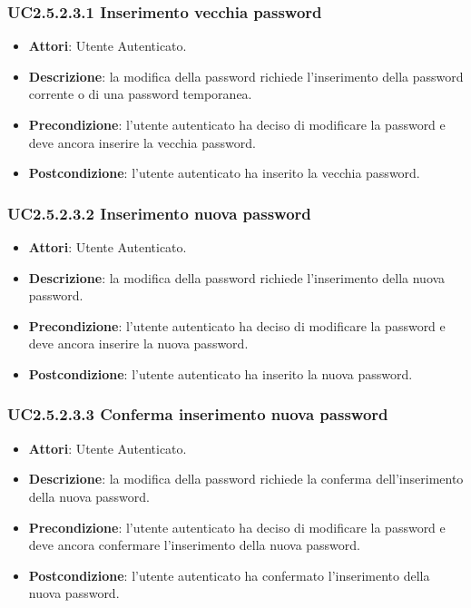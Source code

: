 \subsubsection{UC2.5.2.3.1 Inserimento vecchia password}
\begin{itemize}
\item \textbf{Attori}: Utente Autenticato.
\item \textbf{Descrizione}: la modifica della password richiede l'inserimento della password corrente o di una password temporanea.
\item \textbf{Precondizione}: l'utente autenticato ha deciso di modificare la password e deve ancora inserire la vecchia password.
\item \textbf{Postcondizione}: l'utente autenticato ha inserito la vecchia password.
\end{itemize}
\subsubsection{UC2.5.2.3.2 Inserimento nuova password}
\begin{itemize}
\item \textbf{Attori}: Utente Autenticato.
\item \textbf{Descrizione}: la modifica della password richiede l'inserimento della nuova password.
\item \textbf{Precondizione}: l'utente autenticato ha deciso di modificare la password e deve ancora inserire la nuova password.
\item \textbf{Postcondizione}: l'utente autenticato ha inserito la nuova password.
\end{itemize}
\subsubsection{UC2.5.2.3.3 Conferma inserimento nuova password}
\begin{itemize}
\item \textbf{Attori}: Utente Autenticato.
\item \textbf{Descrizione}: la modifica della password richiede la conferma dell'inserimento della nuova password.
\item \textbf{Precondizione}: l'utente autenticato ha deciso di modificare la password e deve ancora confermare l'inserimento della nuova password.
\item \textbf{Postcondizione}: l'utente autenticato ha confermato l'inserimento della nuova password.
\end{itemize}

